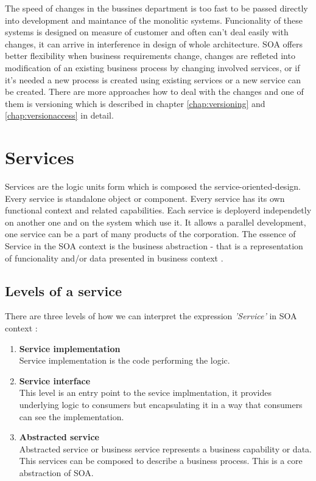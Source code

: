 The speed of changes in the bussines department is too fast to be passed directly into development and maintance of the monolitic systems. Funcionality of these systems is designed on measure of customer and often can't deal easily with changes, it can arrive in interference in design of whole architecture. SOA offers better flexibility when business requirements change, changes are refleted into modification of an existing business process by changing involved services, or if it's needed a new process is created using existing services or a new service can be created. There are more approaches how to deal with the changes and one of them is versioning which is described in chapter \ref{chap:versioning} and \ref{chap:versionaccess} in detail.

\section{Services}
\label{sec:services}
Services are the logic units form which is composed the \gls{service-oriented-design}. Every service is standalone object or component. Every service has its own functional context and related capabilities. Each service is deployerd independetly on another one and on the system which use it. It allows a parallel development, one service can be a part of many products of the corporation.
The essence of Service in the SOA context is the business abstraction - that is a representation of funcionality and/or data presented in business context \cite{agile-architecture}.

\subsection{Levels of a service} 
\label{subsec:levels-of-serivce}

There are three levels of how we can interpret the expression \emph{'Service'} in SOA context \cite{agile-architecture}:
\begin{enumerate}
  \item \textbf{Service implementation} \hfill \\
Service implementation is the code performing the logic.
  \item \textbf{Service interface} \hfill \\ 
This level is an entry point to the sevice implmentation, it provides underlying logic to consumers but encapsulating it in a way that consumers can see the implementation. 
  \item \textbf{Abstracted service} \hfill \\
Abstracted service or business service represents a business capability or data. This services can be composed to describe a business process. This is a core abstraction of SOA.
\end{enumerate}

